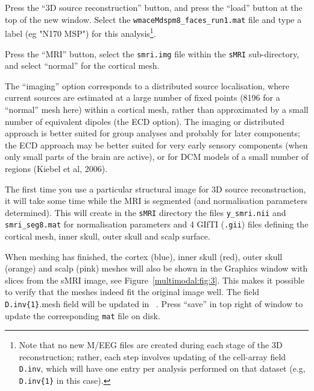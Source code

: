 Press the ``3D source reconstruction'' button, and press the ``load'' button at the top of the new window. Select the \verb!wmaceMdspm8_faces_run1.mat! file and type a label (eg "N170 MSP") for this analysis\footnote{Note that no new M/EEG files are created during each stage of the 3D reconstruction; rather, each step involves updating of the cell-array field \texttt{D.inv}, which will have one entry per analysis performed on that dataset (e.g, \texttt{D.inv\{1\}} in this case).}.

Press the ``MRI'' button, select the \texttt{smri.img} file within the \texttt{sMRI} sub-directory, and select ``normal'' for the cortical mesh.

The ``imaging'' option corresponds to a distributed source localisation, where current sources are estimated at a large number of fixed points (8196 for a ``normal'' mesh here) within a cortical mesh, rather than approximated by a small number of equivalent dipoles (the ECD option). The imaging or distributed approach is better suited for group analyses and probably for later components; the ECD approach may be better suited for very early sensory components (when only small parts of the brain are active), or for DCM models of a small number of regions (Kiebel et al, 2006).

The first time you use a particular structural image for 3D source reconstruction, it will take some time while the MRI is segmented (and normalisation parameters determined). This will create in the \texttt{sMRI} directory the files \texttt{y\_smri.nii} and \texttt{smri\_seg8.mat} for normalisation parameters and 4 GIfTI (\texttt{.gii}) files defining the cortical mesh, inner skull, outer skull and scalp surface.

When meshing has finished, the cortex (blue), inner skull (red), outer skull (orange) and scalp (pink) meshes will also be shown in the Graphics window with slices from the sMRI image, see Figure~\ref{multimodal:fig:3}. This makes it possible to verify that the meshes indeed fit the original image well. The field \texttt{D.inv\{1\}}.mesh field will be updated in \matlab\ . Press ``save'' in top right of window to update the corresponding \texttt{mat} file on disk.

